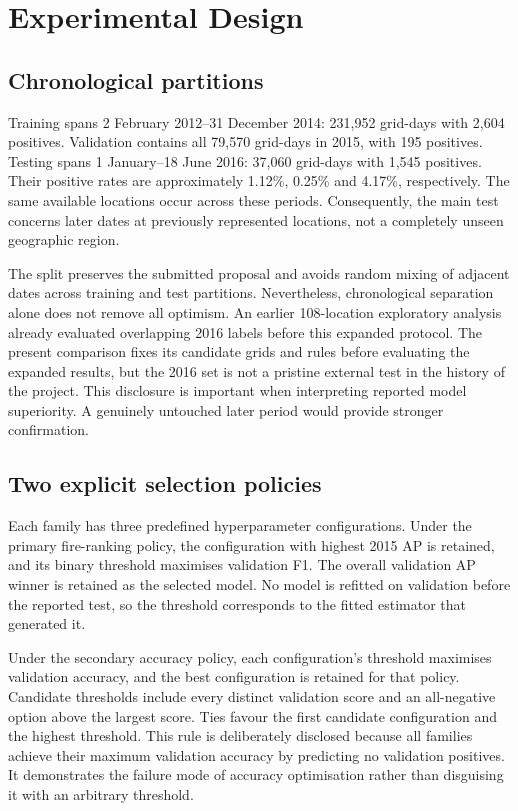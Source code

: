 \documentclass[conference,a4paper]{IEEEtran}
\begin{document}
\section{Experimental Design}
\subsection{Chronological partitions}
Training spans 2 February 2012--31 December 2014: 231,952 grid-days with 2,604 positives. Validation contains all 79,570 grid-days in 2015, with 195 positives. Testing spans 1 January--18 June 2016: 37,060 grid-days with 1,545 positives. Their positive rates are approximately 1.12\%, 0.25\% and 4.17\%, respectively. The same available locations occur across these periods. Consequently, the main test concerns later dates at previously represented locations, not a completely unseen geographic region.

The split preserves the submitted proposal and avoids random mixing of adjacent dates across training and test partitions. Nevertheless, chronological separation alone does not remove all optimism. An earlier 108-location exploratory analysis already evaluated overlapping 2016 labels before this expanded protocol. The present comparison fixes its candidate grids and rules before evaluating the expanded results, but the 2016 set is not a pristine external test in the history of the project. This disclosure is important when interpreting reported model superiority. A genuinely untouched later period would provide stronger confirmation.

\subsection{Two explicit selection policies}
Each family has three predefined hyperparameter configurations. Under the primary fire-ranking policy, the configuration with highest 2015 AP is retained, and its binary threshold maximises validation F1. The overall validation AP winner is retained as the selected model. No model is refitted on validation before the reported test, so the threshold corresponds to the fitted estimator that generated it.

Under the secondary accuracy policy, each configuration's threshold maximises validation accuracy, and the best configuration is retained for that policy. Candidate thresholds include every distinct validation score and an all-negative option above the largest score. Ties favour the first candidate configuration and the highest threshold. This rule is deliberately disclosed because all families achieve their maximum validation accuracy by predicting no validation positives. It demonstrates the failure mode of accuracy optimisation rather than disguising it with an arbitrary threshold.
\end{document}
